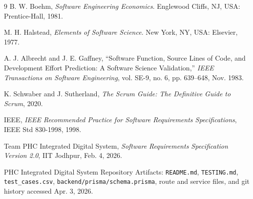 \documentclass[conference]{IEEEtran}
\begin{document}
\begin{thebibliography}{9}
B. W. Boehm, \textit{Software Engineering Economics}. Englewood Cliffs, NJ, USA: Prentice-Hall, 1981.

M. H. Halstead, \textit{Elements of Software Science}. New York, NY, USA: Elsevier, 1977.

A. J. Albrecht and J. E. Gaffney, ``Software Function, Source Lines of Code, and Development Effort Prediction: A Software Science Validation,'' \textit{IEEE Transactions on Software Engineering}, vol. SE-9, no. 6, pp. 639--648, Nov. 1983.

K. Schwaber and J. Sutherland, \textit{The Scrum Guide: The Definitive Guide to Scrum}, 2020.

IEEE, \textit{IEEE Recommended Practice for Software Requirements Specifications}, IEEE Std 830-1998, 1998.

Team PHC Integrated Digital System, \textit{Software Requirements Specification Version 2.0}, IIT Jodhpur, Feb. 4, 2026.

PHC Integrated Digital System Repository Artifacts: \texttt{README.md}, \texttt{TESTING.md}, \texttt{test\_cases.csv}, \texttt{backend/prisma/schema.prisma}, route and service files, and git history accessed Apr. 3, 2026.
\end{thebibliography}
\end{document}
